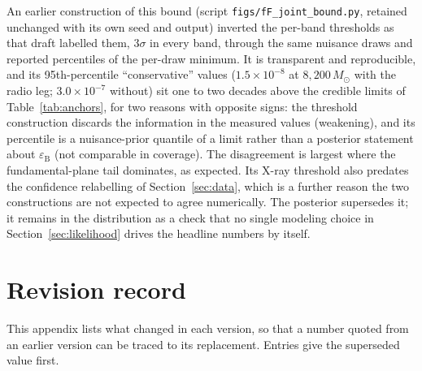 \documentclass[11pt]{article}
\newcommand{\msun}{\ensuremath{M_\odot}}
\newcommand{\eps}{\ensuremath{\varepsilon_{\mathrm{B}}}}
\begin{document}
An earlier construction of this bound (script \texttt{figs/fF\_joint\_bound.py}, retained unchanged with its own seed and output) inverted the per-band thresholds as that draft labelled them, $3\sigma$ in every band, through the same nuisance draws and reported percentiles of the per-draw minimum. It is transparent and reproducible, and its 95th-percentile ``conservative'' values ($1.5\times10^{-8}$ at $8{,}200\,\msun$ with the radio leg; $3.0\times10^{-7}$ without) sit one to two decades above the credible limits of Table~\ref{tab:anchors}, for two reasons with opposite signs: the threshold construction discards the information in the measured values (weakening), and its percentile is a nuisance-prior quantile of a limit rather than a posterior statement about $\eps$ (not comparable in coverage). The disagreement is largest where the fundamental-plane tail dominates, as expected. Its X-ray threshold also predates the confidence relabelling of Section~\ref{sec:data}, which is a further reason the two constructions are not expected to agree numerically. The posterior supersedes it; it remains in the distribution as a check that no single modeling choice in Section~\ref{sec:likelihood} drives the headline numbers by itself.

\section{Revision record}
\label{app:revision}

This appendix lists what changed in each version, so that a number quoted from an earlier version can be traced to its replacement. Entries give the superseded value first.
\end{document}
